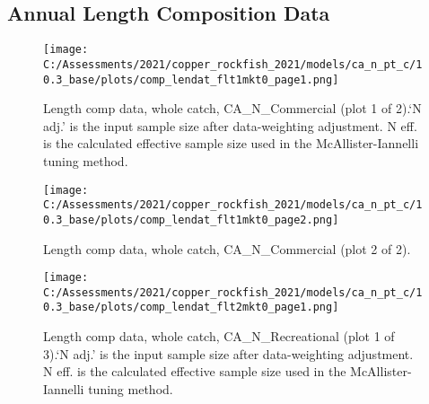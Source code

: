 \documentclass[11pt,
  english,
  a4paper,
]{article}
\begin{document}
\tagmcend\tagstructend

\newpage


\hypertarget{annual-length-composition-data}{%
\subsection{Annual Length Composition Data}\label{annual-length-composition-data}}

\leavevmode\tagmcend\tagstructend


\begin{figure}
\centering
\texttt{[image: C:/Assessments/2021/copper\_rockfish\_2021/models/ca\_n\_pt\_c/10.3\_base/plots/comp\_lendat\_flt1mkt0\_page1.png]}
\caption{Length comp data, whole catch, CA\_N\_Commercial (plot 1 of 2).`N adj.' is the input sample size after data-weighting adjustment. N eff. is the calculated effective sample size used in the McAllister-Iannelli tuning method.\label{fig:comp_lendat_flt1mkt0_page1}}
\end{figure}

\tagmcend\tagstructend


\begin{figure}
\centering
\texttt{[image: C:/Assessments/2021/copper\_rockfish\_2021/models/ca\_n\_pt\_c/10.3\_base/plots/comp\_lendat\_flt1mkt0\_page2.png]}
\caption{Length comp data, whole catch, CA\_N\_Commercial (plot 2 of 2).\label{fig:comp_lendat_flt1mkt0_page2}}
\end{figure}

\tagmcend\tagstructend


\begin{figure}
\centering
\texttt{[image: C:/Assessments/2021/copper\_rockfish\_2021/models/ca\_n\_pt\_c/10.3\_base/plots/comp\_lendat\_flt2mkt0\_page1.png]}
\caption{Length comp data, whole catch, CA\_N\_Recreational (plot 1 of 3).`N adj.' is the input sample size after data-weighting adjustment. N eff. is the calculated effective sample size used in the McAllister-Iannelli tuning method.\label{fig:comp_lendat_flt2mkt0_page1}}
\end{figure}
\end{document}
